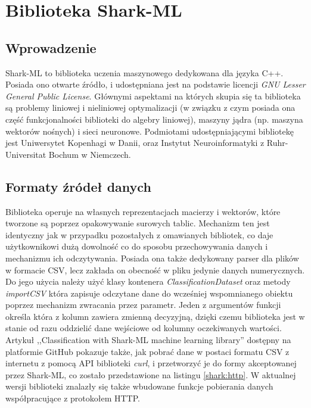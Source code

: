 \chapter{Biblioteka Shark-ML}

\section{Wprowadzenie}

Shark-ML to biblioteka uczenia maszynowego dedykowana dla języka C++. Posiada ono otwarte źródło, i udostępniana jest na podstawie licencji \textit{GNU Lesser General Public License}. Głównymi aspektami na których skupia się ta biblioteka są problemy liniowej i nieliniowej optymalizacji (w związku z czym posiada ona część funkcjonalności biblioteki do algebry liniowej), maszyny jądra (np. maszyna wektorów nośnych) i sieci neuronowe. \cite{shark} Podmiotami udostępniającymi bibliotekę jest Uniwersytet Kopenhagi w Danii, oraz Instytut Neuroinformatyki z Ruhr-Universitat Bochum w Niemczech.

\section{Formaty źródeł danych}

Biblioteka operuje na własnych reprezentacjach macierzy i wektorów, które tworzone są poprzez opakowywanie surowych tablic. Mechanizm ten jest identyczny jak w przypadku pozostałych z omawianych bibliotek, co daje użytkownikowi dużą dowolność co do sposobu przechowywania danych i mechanizmu ich odczytywania. Posiada ona także dedykowany parser dla plików w formacie CSV, lecz zakłada on obecność w pliku jedynie danych numerycznych. Do jego użycia należy użyć klasy kontenera \textit{ClassificationDataset} oraz metody \textit{importCSV} która zapisuje odczytane dane do wcześniej wspomnianego obiektu poprzez mechanizm zwracania przez parametr. Jeden z argumentów funkcji określa która z kolumn zawiera zmienną decyzyjną, dzięki czemu biblioteka jest w stanie od razu oddzielić dane wejściowe od kolumny oczekiwanych wartości. Artykuł ,,Classification with Shark-ML machine learning library''\cite{shark:http} dostępny na platformie GitHub pokazuje także, jak pobrać dane w postaci formatu CSV z internetu z pomocą API biblioteki \textit{curl}, i przetworzyć je do formy akceptowanej przez Shark-ML, co zostało przedstawione na listingu \ref{shark:http}. W aktualnej wersji biblioteki znalazły się także wbudowane funkcje pobierania danych współpracujące z protokołem HTTP.

